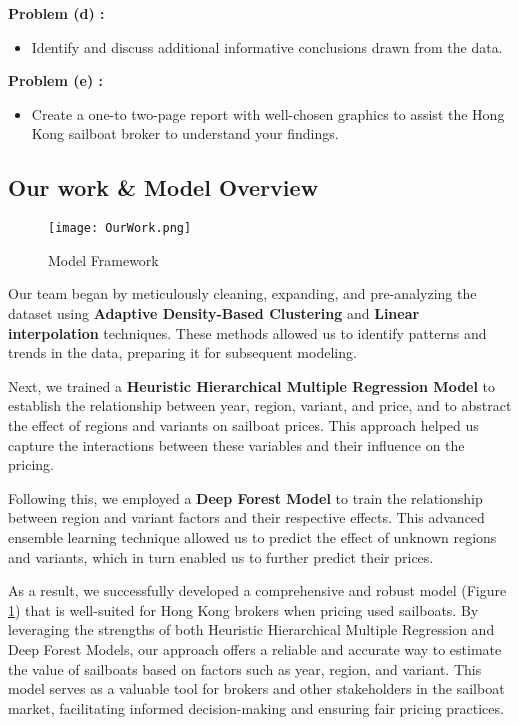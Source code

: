 \documentclass[12pt]{article}  %
\begin{document}
\textbf{Problem (d) :}
\begin{itemize}
    \item Identify and discuss additional informative conclusions drawn from the data.
\end{itemize}

\textbf{Problem (e) :}
\begin{itemize}
    \item Create a one-to two-page report with well-chosen graphics to assist the Hong Kong sailboat broker to understand your findings.
\end{itemize}
\subsection{Our work \& Model Overview}
\begin{figure}[htbp]
    \centering
    \texttt{[image: OurWork.png]}
    \caption{Model Framework}\label{fig:OurWork}
\end{figure}
Our team began by meticulously cleaning, expanding, and pre-analyzing the dataset using \textbf{Adaptive Density-Based Clustering} and \textbf{Linear interpolation} techniques. These methods allowed us to identify patterns and trends in the data, preparing it for subsequent modeling.

Next, we trained a \textbf{Heuristic Hierarchical Multiple Regression Model} to establish the relationship between year, region, variant, and price, and to abstract the effect of regions and variants on sailboat prices. This approach helped us capture the interactions between these variables and their influence on the pricing.

Following this, we employed a \textbf{Deep Forest Model} to train the relationship between region and variant factors and their respective effects. This advanced ensemble learning technique allowed us to predict the effect of unknown regions and variants, which in turn enabled us to further predict their prices.

As a result, we successfully developed a comprehensive and robust model (Figure \ref{fig:OurWork}) that is well-suited for Hong Kong brokers when pricing used sailboats. By leveraging the strengths of both Heuristic Hierarchical Multiple Regression and Deep Forest Models, our approach offers a reliable and accurate way to estimate the value of sailboats based on factors such as year, region, and variant. This model serves as a valuable tool for brokers and other stakeholders in the sailboat market, facilitating informed decision-making and ensuring fair pricing practices.
\end{document}
